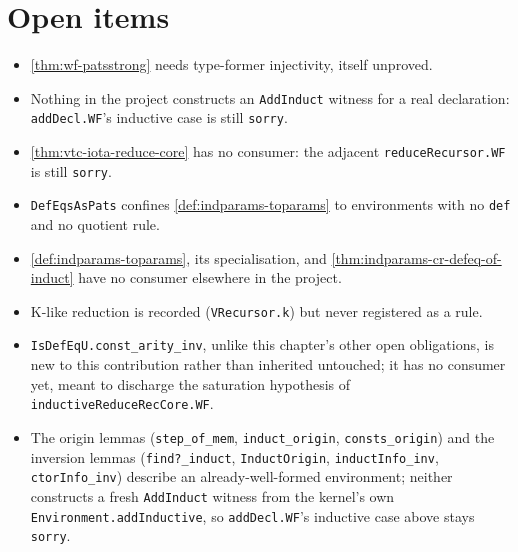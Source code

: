 \section{Open items}
\label{sec:contrib-iota-hygiene}
\begin{itemize}
\item \ref{thm:wf-patsstrong} needs type-former injectivity, itself unproved.
\item Nothing in the project constructs an \texttt{AddInduct} witness for a real
declaration: \texttt{addDecl.WF}'s inductive case is still \texttt{sorry}.
\item \ref{thm:vtc-iota-reduce-core} has no consumer: the adjacent \texttt{reduceRecursor.WF}
is still \texttt{sorry}.
\item \texttt{DefEqsAsPats} confines \ref{def:indparams-toparams} to environments with no
\texttt{def} and no quotient rule.
\item \ref{def:indparams-toparams}, its specialisation, and
\ref{thm:indparams-cr-defeq-of-induct} have no consumer elsewhere in the project.
\item K-like reduction is recorded (\texttt{VRecursor.k}) but never registered as a rule.
\item \texttt{IsDefEqU.const\_arity\_inv}, unlike this chapter's other open obligations, is
new to this contribution rather than inherited untouched; it has no consumer yet, meant to
discharge the saturation hypothesis of \texttt{inductiveReduceRecCore.WF}.
\item The origin lemmas (\texttt{step\_of\_mem}, \texttt{induct\_origin},
\texttt{consts\_origin}) and the inversion lemmas (\texttt{find?\_induct},
\texttt{InductOrigin}, \texttt{inductInfo\_inv}, \texttt{ctorInfo\_inv}) describe an
already-well-formed environment; neither constructs a fresh \texttt{AddInduct} witness from
the kernel's own \texttt{Environment.addInductive}, so \texttt{addDecl.WF}'s inductive case
above stays \texttt{sorry}.
\end{itemize}
